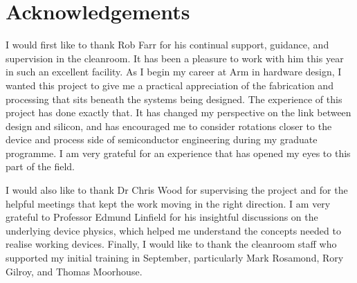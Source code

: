 \cleardoublepage
\chapter*{Acknowledgements}

I would first like to thank Rob Farr for his continual support, guidance, and
supervision in the cleanroom. It has been a pleasure to work with him this year
in such an excellent facility. As I begin my career at Arm in hardware design,
I wanted this project to give me a practical appreciation of the fabrication and
processing that sits beneath the systems being designed. The
experience of this project has done exactly that. It has changed my perspective on the link
between design and silicon, and has encouraged me to consider rotations closer
to the device and process side of semiconductor engineering during my graduate
programme. I am very grateful for an experience that has opened my eyes to this
part of the field.

\vspace{1mm}

I would also like to thank Dr Chris Wood for supervising the project and for
the helpful meetings that kept the work moving in the right direction. I am
very grateful to Professor Edmund Linfield for his insightful discussions on the
underlying device physics, which helped me understand the concepts needed to
realise working devices. Finally, I would like to thank the cleanroom staff who
supported my initial training in September, particularly Mark Rosamond, Rory
Gilroy, and Thomas Moorhouse.
